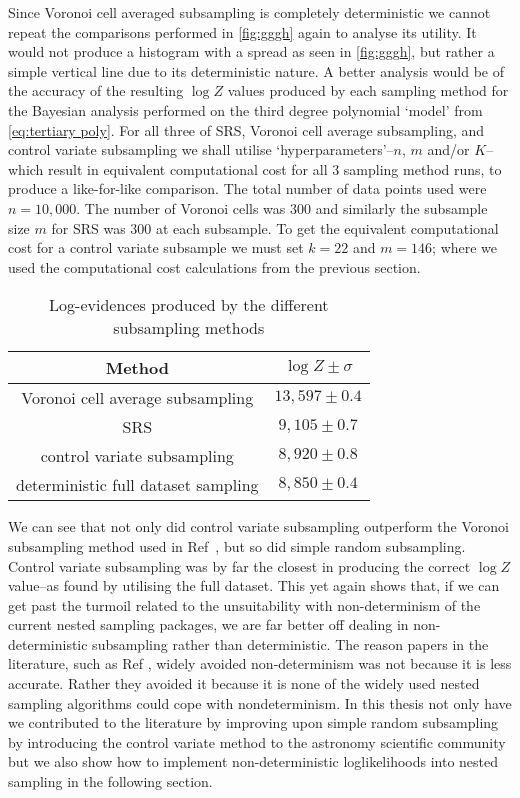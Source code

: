 Since Voronoi cell averaged subsampling is completely deterministic we cannot repeat the comparisons performed in \cref{fig:gggh} again to analyse its utility. It would not produce a histogram with a spread as seen in \cref{fig:gggh}, but rather a simple vertical line due to its deterministic nature. A better analysis would be of the accuracy of the resulting $\log Z$ values produced by each sampling method for the Bayesian analysis performed on the third degree polynomial `model' from \cref{eq:tertiary poly}. For all three of SRS, Voronoi cell average subsampling, and control variate subsampling we shall utilise `hyperparameters'--$n$, $m$ and/or $K$--which result in equivalent computational cost for all 3 sampling method runs, to produce a like-for-like comparison. The total number of data points used were $n=10,000$. The number of Voronoi cells was $300$ and similarly the subsample size $m$ for SRS was $300$ at each subsample. To get the equivalent computational cost for a control variate subsample we must set $k=22$ and $m=146$; where we used the computational cost calculations from the previous section.



\begin{table}[h!]
\begin{center}
\begin{tabular}{c|c}
Method                              & $\log Z \pm \sigma$ \\
\hline
Voronoi cell average subsampling    & $13,597 \pm 0.4$    \\
SRS                                 & $9,105 \pm 0.7$     \\
control variate subsampling         & $8,920 \pm 0.8$     \\
deterministic full dataset sampling & $8,850 \pm 0.4$    
\end{tabular}
\end{center}
\caption{Log-evidences produced by the different subsampling methods\label{tab:subsampling}}
\end{table}

We can see that not only did control variate subsampling outperform the Voronoi subsampling method used in Ref~\cite{Mihaylov_2020}, but so did simple random subsampling. Control variate subsampling was by far the closest in producing the correct $\log Z$ value--as found by utilising the full dataset. This yet again shows that, if we can get past the turmoil related to the unsuitability with non-determinism of the current nested sampling packages, we are far better off dealing in non-deterministic subsampling rather than deterministic. The reason papers in the literature, such as Ref \cite{Mihaylov_2020}, widely avoided non-determinism was not because it is less accurate. Rather they avoided it because it is none of the widely used nested sampling algorithms could cope with nondeterminism. In this thesis not only have we contributed to the literature by improving upon simple random subsampling by introducing the control variate method to the astronomy scientific community but we also show how to implement non-deterministic loglikelihoods into nested sampling in the following section.

